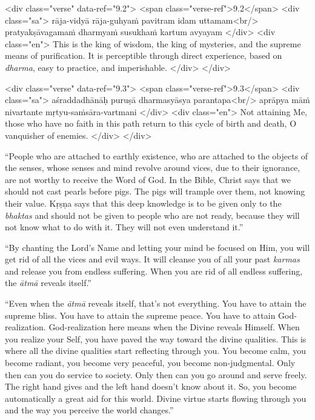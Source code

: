 \begin{html}
<div class="verse" data-ref="9.2">
  <span class="verse-ref">9.2</span>
  <div class="sa">
    rāja-vidyā rāja-guhyaṁ pavitram idam uttamam<br/>
    pratyakṣāvagamaṁ dharmyaṁ susukhaṁ kartum avyayam
  </div>
  <div class="en">
    This is the king of wisdom, the king of mysteries, and the supreme means of purification. It is perceptible through direct experience, based on \textit{dharma}, easy to practice, and imperishable.
  </div>
</div>
\end{html}



\begin{html}
<div class="verse" data-ref="9.3">
  <span class="verse-ref">9.3</span>
  <div class="sa">
    aśraddadhānāḥ puruṣā dharmasyāsya parantapa<br/>
    aprāpya māṁ nivartante mṛtyu-saṁsāra-vartmani
  </div>
  <div class="en">
    Not attaining Me, those who have no faith in this path return to this cycle of birth and death, O vanquisher of enemies.
  </div>
</div>
\end{html}


\enquote{People who are attached to earthly existence, who are attached to the objects of the senses, whose senses and mind revolve around vices, due to their ignorance, are not worthy to receive the Word of God. In the Bible, Christ says that we should not cast pearls before pigs. The pigs will trample over them, not knowing their value. Kṛṣṇa says that this deep knowledge is to be given only to the \textit{bhaktas} and should not be given to people who are not ready, because they will not know what to do with it. They will not even understand it.}

\enquote{By chanting the Lord’s Name and letting your mind be focused on Him, you will get rid of all the vices and evil ways. It will cleanse you of all your past \textit{karmas} and release you from endless suffering. When you are rid of all endless suffering, the \textit{ātmā} reveals itself.}

\enquote{Even when the \textit{ātmā} reveals itself, that’s not everything. You have to attain the supreme bliss. You have to attain the supreme peace. You have to attain God-realization. God-realization here means when the Divine reveals Himself. When you realize your Self, you have paved the way toward the divine qualities. This is where all the divine qualities start reflecting through you. You become calm, you become radiant, you become very peaceful, you become non-judgmental. Only then can you do service to society. Only then can you go around and serve freely. The right hand gives and the left hand doesn’t know about it. So, you become automatically a great aid for this world. Divine virtue starts flowing through you and the way you perceive the world changes.}


